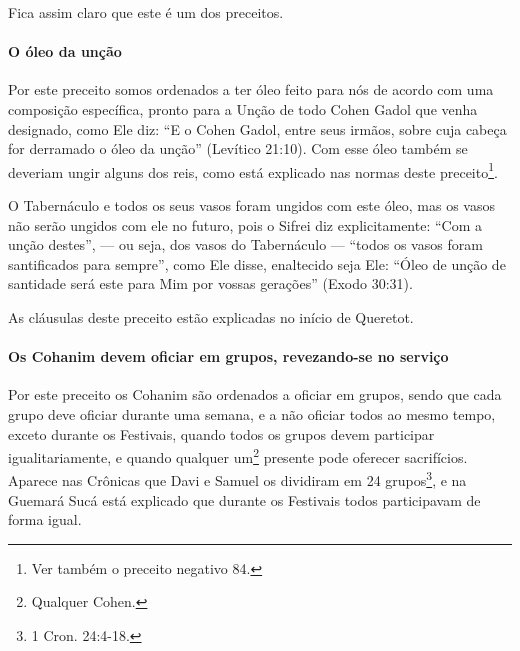 Fica assim claro que este é um dos preceitos.

\paragraph{O óleo da unção}

Por este preceito somos ordenados a ter óleo feito para nós de acordo
com uma composição específica, pronto para a Unção de todo Cohen Gadol que venha designado, como Ele diz: ``E o Cohen Gadol, entre seus
irmãos, sobre cuja cabeça for derramado o óleo da unção'' (Levítico
21:10). Com esse óleo também se deveriam ungir alguns dos reis, como
está explicado nas normas deste preceito\footnote{Ver também o preceito negativo 84.}.

O Tabernáculo e todos os seus vasos foram ungidos com este óleo,
mas os vasos não serão ungidos com ele no futuro, pois o Sifrei diz
explicitamente: ``Com a unção destes'', --- ou seja, dos vasos do
Tabernáculo --- ``todos os vasos foram santificados para sempre'', como
Ele disse, enaltecido seja Ele: ``Óleo de unção de santidade será este
para Mim por vossas gerações'' (Exodo 30:31).

As cláusulas deste preceito estão explicadas no início de Queretot.

\paragraph{Os Cohanim devem oficiar em grupos, revezando-se no serviço}

Por este preceito os Cohanim são ordenados a oficiar em grupos,
sendo que cada grupo deve oficiar durante uma semana, e a não oficiar
todos ao mesmo tempo, exceto durante os Festivais, quando todos os grupos
devem participar igualitariamente, e quando qualquer
um\footnote{Qualquer Cohen.} presente pode oferecer sacrifícios. Aparece nas Crônicas que Davi e Samuel os dividiram em 24 grupos\footnote{1 Cron. 24:4-18.},
e na Guemará Sucá está explicado que durante os Festivais todos
participavam de forma igual.

